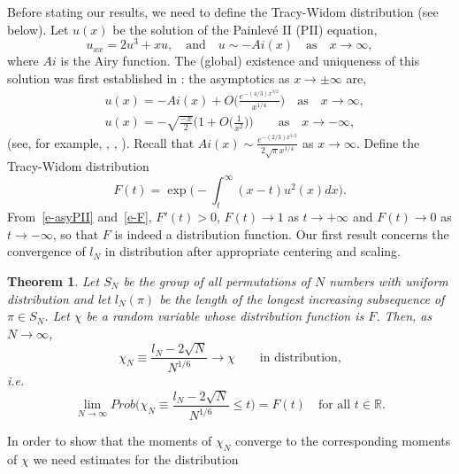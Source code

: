 \documentclass{amsart}
\newtheorem{thm}{Theorem}[section]
\theoremstyle{definition}
\theoremstyle{remark}
\numberwithin{equation}{section}
\newcommand{\R}{\mathbb R}
\begin{document}
\bigskip
Before stating our results, we need to define the Tracy-Widom 
distribution \cite{TW} (see below).
Let $u(x)$ be the solution of the Painlev\'e II (PII) equation,
\begin{equation}\label{e-int1}
  u_{xx}=2u^3+xu, \quad\text{and}\quad 
u\sim -Ai(x)\quad\text{as}\quad x\to\infty,
\end{equation}
where $Ai$ is the Airy function.
The (global) existence and uniqueness of this solution was first 
established in \cite{HM} : 
the asymptotics as $x\to\pm\infty$ are,  
\begin{equation}\label{e-asyPII}
  \begin{split}
   &u(x)=-Ai(x)+O\biggl(\frac{e^{-(4/3)x^{3/2}}}{x^{1/4}}\biggr) 
\quad \text{as}\quad x\to\infty,\\
   &u(x)= -\sqrt{\frac{-x}2} \biggl(1+O\bigl(\frac1{x^2}\bigr)\biggr) 
\qquad \text{as}
\quad x\to -\infty,
  \end{split}
\end{equation}
(see, for example, \cite{HM}, \cite{IN}, \cite{DZ}).
Recall \cite{AS} that $Ai(x)\sim 
\frac{e^{-(2/3)x^{3/2}}}{2\sqrt{\pi}x^{1/4}}$ as $x\to\infty$.
Define the Tracy-Widom distribution 
\begin{equation}\label{e-F}
  F(t) = \exp \biggl(-\int_t^\infty (x-t)u^2(x) dx\biggr).
\end{equation}
From~\eqref{e-asyPII} and~\eqref{e-F}, $F'(t)>0$, 
$F(t)\to 1$ as $t\to +\infty$ and $F(t)\to 0$ 
as $t\to -\infty$, so that $F$ is indeed a distribution function.
Our first result concerns the convergence of $l_N$ in distribution 
after appropriate centering and scaling. 
\begin{thm}\label{thm1}
  Let $S_N$ be the group of all permutations of $N$ numbers
with uniform distribution and let $l_N(\pi)$ be the length of
the longest increasing subsequence of $\pi\in S_N$.
   Let $\chi$ be a random variable whose distribution function is $F$.
   Then, as $N\to\infty$, 
\begin{equation*}
   \chi_N\equiv\frac{l_N-2\sqrt{N}}{N^{1/6}}\to\chi 
\qquad\text{in distribution,}
\end{equation*}
i.e.
\begin{equation*}
   \lim_{N\to\infty} Prob\biggl(\chi_N\equiv
\frac{l_N-2\sqrt{N}}{N^{1/6}}\le t\biggr)
=F(t) \quad\text{for all $t\in\R$.}
\end{equation*}
\end{thm}
In order to show that the moments of $\chi_N$ converge to the
corresponding moments of $\chi$ we need estimates for the distribution
\end{document}
